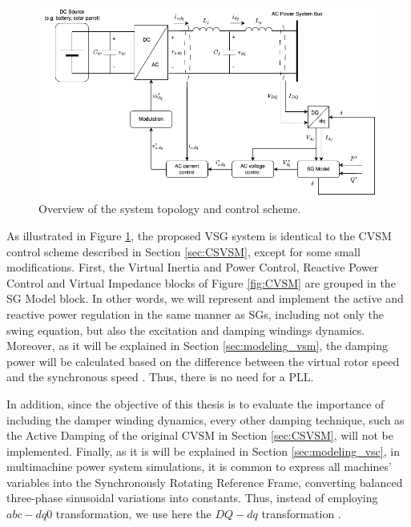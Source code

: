 \begin{figure}[ht!]
    \centering
    \includegraphics[width=12cm]{images/generic_gfmi.png}
    \caption{Overview of the system topology and control scheme.}
    \label{fig:generic_gfmi}
\end{figure}

As illustrated in Figure \ref{fig:generic_gfmi}, the proposed VSG system is
identical to the CVSM control scheme described in Section \ref{sec:CSVSM},
except for some small modifications. First, the Virtual Inertia and Power
Control, Reactive Power Control and Virtual Impedance blocks of Figure
\ref{fig:CVSM} are grouped in the SG Model block. In other words, we will
represent and implement the active and reactive power regulation in the same 
manner as SGs, including not only the swing equation, but also the excitation
and damping windings dynamics. Moreover, as it will be explained in Section
\ref{sec:modeling_vsm}, the damping power will be calculated based on the
difference between the virtual rotor speed and the synchronous speed
\cite{sauer2017power,kundur2022power,krause2002analysis}. Thus, there is no need
for a PLL.

In addition, since the objective of this thesis is to evaluate the importance of
including the damper winding dynamics, every other damping technique, such as
the Active Damping of the original CVSM in Section \ref{sec:CSVSM}, will not be
implemented. Finally, as it is will be explained in Section
\ref{sec:modeling_vsc}, in multimachine power system simulations, it is common
to express all machines' variables into the Synchronously Rotating Reference
Frame, converting balanced three-phase sinusoidal variations into constants.
Thus, instead of employing $abc-dq0$ transformation, we use here the $DQ-dq$
transformation \cite{sauer2017power}.

